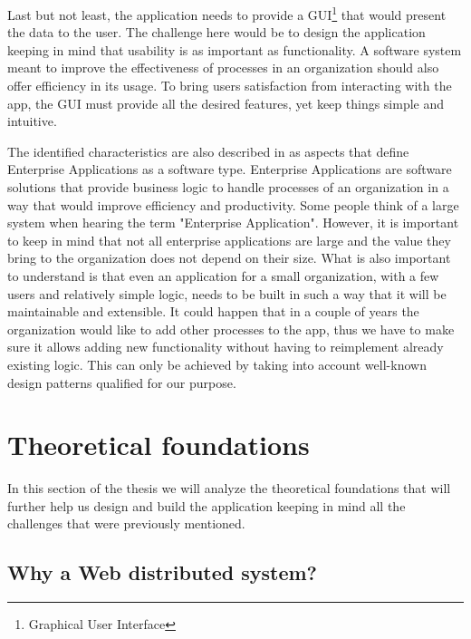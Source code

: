 Last but not least, the application needs to provide a GUI\footnote{Graphical User Interface} that would present the data to the user. The challenge here would be to design the application keeping in mind that usability is as important as functionality. A software system meant to improve the effectiveness of processes in an organization should also offer efficiency in its usage. To bring users satisfaction from interacting with the app, the GUI must provide all the desired features, yet keep things simple and intuitive.

The identified characteristics are also described in \cite{patternsOfEnterpriseApplicationArchitecture} as aspects that define Enterprise Applications as a software type. Enterprise Applications are software solutions that provide business logic to handle processes of an organization in a way that would improve efficiency and productivity. Some people think of a large system when hearing the term "Enterprise Application". However, it is important to keep in mind that not all enterprise applications are large and the value they bring to the organization does not depend on their size. What is also important to understand is that even an application for a small organization, with a few users and relatively simple logic, needs to be built in such a way that it will be maintainable and extensible. It could happen that in a couple of years the organization would like to add other processes to the app, thus we have to make sure it allows adding new functionality without having to reimplement already existing logic. This can only be achieved by taking into account well-known design patterns qualified for our purpose.



\section{Theoretical foundations}
\label{section:theoreticalFoundations}

In this section of the thesis we will analyze the theoretical foundations that will further help us design and build the application keeping in mind all the challenges that were previously mentioned.


\subsection{Why a Web distributed system?}
\label{subsection:whyAWebDistributedSystem}

